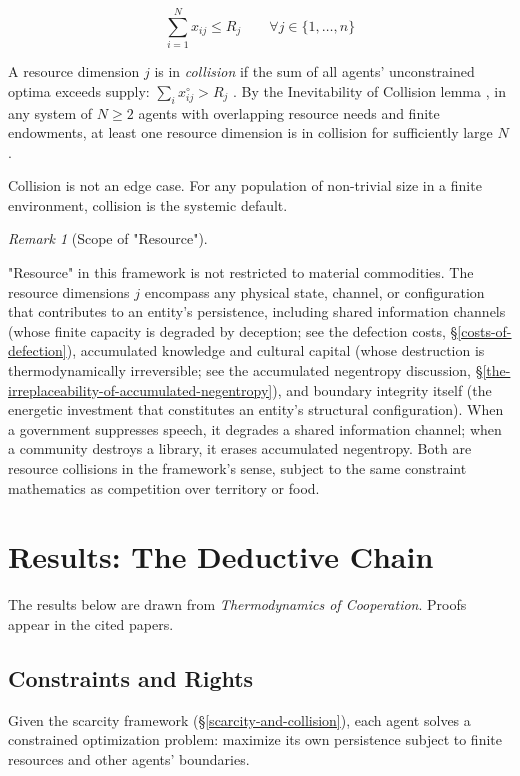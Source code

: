 \documentclass[11pt]{article}
\theoremstyle{plain}
\theoremstyle{definition}
\theoremstyle{remark}
\newtheorem{remark}{Remark}
\let\origsection\section
\renewcommand{\section}{\needspace{12\baselineskip}\origsection}
\let\origsubsection\subsection
\renewcommand{\subsection}{\needspace{7\baselineskip}\origsubsection}
\begin{document}
\[\sum_{i=1}^{N} x_{ij} \leq R_j \qquad \forall j \in \{1, \ldots, n\}\]

A resource dimension \(j\) is in \emph{collision} if the sum of all
agents' unconstrained optima exceeds supply:
\(\sum_i x_{ij}^{\circ} > R_j\) \citep{TC-I}. By the Inevitability of
Collision lemma \citep{TC-I}, in any system of \(N \geq 2\) agents with
overlapping resource needs and finite endowments, at least one resource
dimension is in collision for sufficiently large \(N\).

Collision is not an edge case. For any population of non-trivial size in
a finite environment, collision is the systemic default.

\begin{remark}[Scope of "Resource"]
\label{rem-resource-scope}

"Resource" in this framework is not restricted to material commodities. The resource dimensions $j$ encompass any physical state, channel, or configuration that contributes to an entity's persistence, including shared information channels (whose finite capacity is degraded by deception; see the defection costs, §\ref{costs-of-defection}), accumulated knowledge and cultural capital (whose destruction is thermodynamically irreversible; see the accumulated negentropy discussion, §\ref{the-irreplaceability-of-accumulated-negentropy}), and boundary integrity itself (the energetic investment that constitutes an entity's structural configuration). When a government suppresses speech, it degrades a shared information channel; when a community destroys a library, it erases accumulated negentropy. Both are resource collisions in the framework's sense, subject to the same constraint mathematics as competition over territory or food.
\end{remark}

\section{Results: The Deductive
Chain}\label{results-the-deductive-chain}

The results below are drawn from \emph{Thermodynamics of Cooperation}.
Proofs appear in the cited papers.

\subsection{Constraints and Rights}\label{constraints-and-rights}

Given the scarcity framework (§\ref{scarcity-and-collision}), each agent
solves a constrained optimization problem: maximize its own persistence
subject to finite resources and other agents' boundaries.
\end{document}
